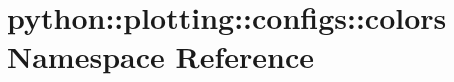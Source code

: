 \hypertarget{namespacepython_1_1plotting_1_1configs_1_1colors}{
\section{python::plotting::configs::colors Namespace Reference}
\label{namespacepython_1_1plotting_1_1configs_1_1colors}
}
